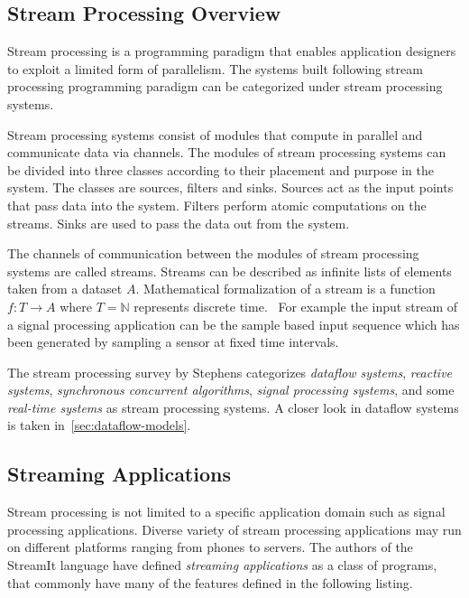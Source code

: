 
\subsection{Stream Processing Overview}
\label{subsec:stream-processing-overview}
Stream processing is a programming paradigm that enables application designers to exploit a limited form of parallelism. The systems built following stream processing programming paradigm can be categorized under stream processing systems.

Stream processing systems consist of modules that compute in parallel and communicate data via channels. The modules of stream processing systems can be divided into three classes according to their placement and purpose in the system. The classes are sources, filters and sinks. Sources act as the input points that pass data into the system. Filters perform atomic computations on the streams. Sinks are used to pass the data out from the system.~\cite{stephens1997survey}

The channels of communication between the modules of stream processing systems are called streams. Streams can be described as infinite lists of elements taken from a dataset $A$. Mathematical formalization of a stream is a function $f:T \rightarrow A$ where $T = \mathbb{N}$ represents discrete time.~\cite{stephens1997survey} For example the input stream of a signal processing application can be the sample based input sequence which has been generated by sampling a sensor at fixed time intervals.

The stream processing survey by Stephens \cite{stephens1997survey} categorizes \textit{dataflow systems}, \textit{reactive systems}, \textit{synchronous concurrent algorithms}, \textit{signal processing systems}, and some \textit{real-time systems} as stream processing systems. A closer look in dataflow systems is taken in~\ref{sec:dataflow-models}.


\subsection{Streaming Applications}
\label{subsec:streaming-applications}
Stream processing is not limited to a specific application domain such as signal processing applications. Diverse variety of stream processing applications may run on different platforms ranging from phones to servers. The authors of the StreamIt language \cite{thies2002streamit} have defined \textit{streaming applications} as a class of programs, that commonly have many of the features defined in the following listing.

